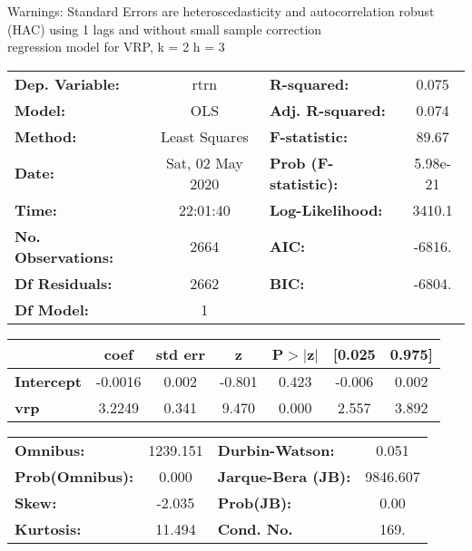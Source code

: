 Warnings: \newline
 [1] Standard Errors are heteroscedasticity and autocorrelation robust (HAC) using 1 lags and without small sample correction\\ 

regression model for VRP, k = 2 h = 3\begin{center}
\begin{tabular}{lclc}
\toprule
\textbf{Dep. Variable:}    &       rtrn       & \textbf{  R-squared:         } &     0.075   \\
\textbf{Model:}            &       OLS        & \textbf{  Adj. R-squared:    } &     0.074   \\
\textbf{Method:}           &  Least Squares   & \textbf{  F-statistic:       } &     89.67   \\
\textbf{Date:}             & Sat, 02 May 2020 & \textbf{  Prob (F-statistic):} &  5.98e-21   \\
\textbf{Time:}             &     22:01:40     & \textbf{  Log-Likelihood:    } &    3410.1   \\
\textbf{No. Observations:} &        2664      & \textbf{  AIC:               } &    -6816.   \\
\textbf{Df Residuals:}     &        2662      & \textbf{  BIC:               } &    -6804.   \\
\textbf{Df Model:}         &           1      & \textbf{                     } &             \\
\bottomrule
\end{tabular}
\begin{tabular}{lcccccc}
                   & \textbf{coef} & \textbf{std err} & \textbf{z} & \textbf{P$> |$z$|$} & \textbf{[0.025} & \textbf{0.975]}  \\
\midrule
\textbf{Intercept} &      -0.0016  &        0.002     &    -0.801  &         0.423        &       -0.006    &        0.002     \\
\textbf{vrp}       &       3.2249  &        0.341     &     9.470  &         0.000        &        2.557    &        3.892     \\
\bottomrule
\end{tabular}
\begin{tabular}{lclc}
\textbf{Omnibus:}       & 1239.151 & \textbf{  Durbin-Watson:     } &    0.051  \\
\textbf{Prob(Omnibus):} &   0.000  & \textbf{  Jarque-Bera (JB):  } & 9846.607  \\
\textbf{Skew:}          &  -2.035  & \textbf{  Prob(JB):          } &     0.00  \\
\textbf{Kurtosis:}      &  11.494  & \textbf{  Cond. No.          } &     169.  \\
\bottomrule
\end{tabular}
\end{center}

